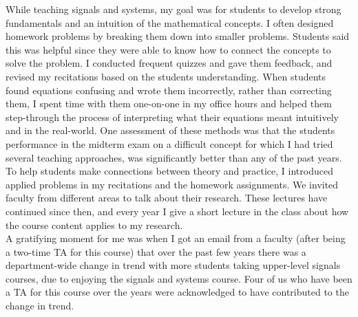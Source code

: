 \documentclass[10pt]{article}
\begin{document}
While teaching signals and systems, my goal was for students to develop strong fundamentals and an intuition of the mathematical concepts. 
I often designed homework problems by breaking them down into smaller problems. Students said this was helpful since they were able to know how to connect the concepts to solve the problem. 
I conducted frequent quizzes and gave them feedback, and revised my recitations based on the students understanding. 
When students found equations confusing and wrote them incorrectly, rather than correcting them, I spent time with them one-on-one in my office hours and helped them step-through the process of interpreting what their equations meant intuitively and in the real-world. 
One assessment of these methods was that the students performance in the midterm exam on a difficult concept for which I had tried several teaching approaches, was significantly better than any of the past years. 
To help students make connections between theory and practice,  I introduced applied problems in my recitations and the homework assignments. We invited faculty from different areas to talk about their research. These lectures have continued since then, and every year I give a short lecture in the class about how the course content applies to my research.  \\

A gratifying moment for me was when I got an email from a faculty (after being a two-time TA for this course)
that over the past few years there was a department-wide change in trend with more students taking upper-level signals courses, due to enjoying the signals and systems course. Four of us who have been a TA for this course over the years were acknowledged to have contributed to the change in trend. \\
\end{document}
